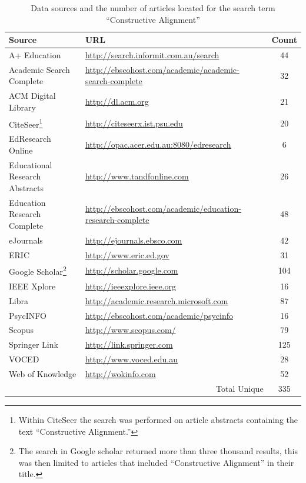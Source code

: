 \begin{savenotes}
\begin{table}[htb]
	\centering
	\caption{Data sources and the number of articles located for the search term ``Constructive Alignment''}
	\label{tbl:review_source}
	\footnotesize
    \begin{tabular}{l|l|c}
    \textbf{Source} & \textbf{URL} & \textbf{Count} \\ \hline
    A+ Education & \url{http://search.informit.com.au/search} & 44 \\
    Academic Search Complete & \scriptsize \url{http://ebscohost.com/academic/academic-search-complete} & 32 \\
    ACM Digital Library & \url{http://dl.acm.org} & 21 \\
    CiteSeer\footnote{Within CiteSeer the search was performed on article abstracts containing the text ``Constructive Alignment.''}  & \url{http://citeseerx.ist.psu.edu} & 20 \\
    EdResearch Online & \url{http://opac.acer.edu.au:8080/edresearch} & 6 \\
    \scriptsize Educational Research Abstracts & \url{http://www.tandfonline.com} & 26 \\
    \scriptsize Education Research Complete & \scriptsize \url{http://ebscohost.com/academic/education-research-complete} & 48 \\
    eJournals & \url{http://ejournals.ebsco.com} & 42 \\
    ERIC & \url{http://www.eric.ed.gov} & 31 \\
    Google Scholar\footnote{The search in Google scholar returned more than three thousand results, this was then limited to articles that included ``Constructive Alignment'' in their title.} & \url{http://scholar.google.com} & 104 \\
    IEEE Xplore & \url{http://ieeexplore.ieee.org} & 16 \\
    Libra & \url{http://academic.research.microsoft.com} & 87\\
	PsycINFO & \url{http://ebscohost.com/academic/psycinfo} & 16 \\
	Scopus & \url{http://www.scopus.com/} & 79 \\
	Springer Link & \url{http://link.springer.com} & 125 \\
	VOCED & \url{http://www.voced.edu.au} & 28 \\
	Web of Knowledge & \url{http://wokinfo.com} & 52 \\ \hline
	\multicolumn{2}{r|}{Total Unique} & 335 \\
    \end{tabular}
\end{table}
\end{savenotes}

